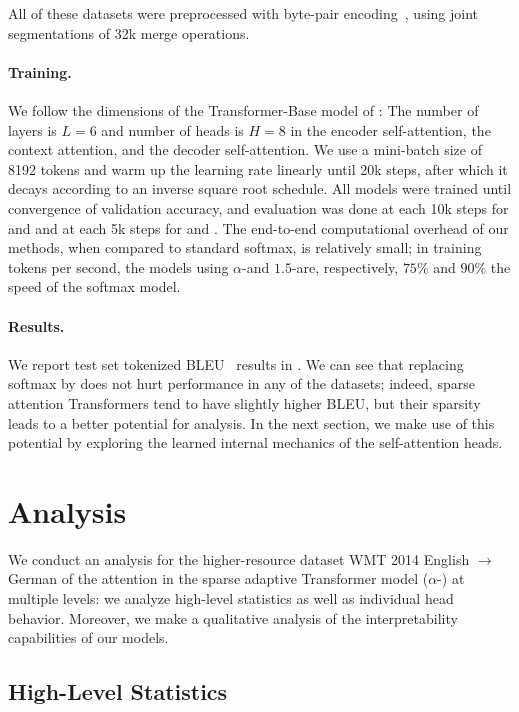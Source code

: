 All of these datasets were preprocessed with byte-pair
encoding~\citep[BPE;][]{sennrich2016neural}, using joint
segmentations of 32k merge operations.

\paragraph*{Training.}
We follow the dimensions of the Transformer-Base model of
\citet{vaswani2017attention}: The number of layers is $L=6$ and
number of heads is $H=8$ in the encoder self-attention, the context
attention, and the decoder self-attention. We use a mini-batch size
of 8192 tokens and warm up the learning rate linearly until 20k
steps, after which it decays according to an inverse square root
schedule. All models were trained until convergence of validation
accuracy, and evaluation was done at each 10k steps for
 and  and at each 5k steps for
 and . The end-to-end computational
overhead of our methods, when compared to standard softmax, is
relatively small; in training tokens per second, the models using
$\alpha$-\entmaxtext and $1.5$-\entmaxtext are, respectively, $75\%$
and $90\%$ the speed of the softmax model.

\paragraph*{Results.}
We report test set tokenized BLEU~\citep{papineni2002bleu} results in
. We can see that replacing softmax by
\entmaxtext{} does not hurt performance in any of the datasets;
indeed, sparse attention Transformers tend to have slightly higher
BLEU, but their sparsity leads to a better potential for analysis. In
the next section, we make use of this potential by exploring the
learned internal mechanics of the self-attention heads.

\section{Analysis}

We conduct an analysis for the higher-resource dataset WMT 2014
English $\rightarrow$ German of the attention in the sparse adaptive
Transformer model ($\alpha$-\entmaxtext) at multiple levels: we
analyze high-level statistics as well as individual head behavior.
Moreover, we make a qualitative analysis of the interpretability
capabilities of our models.

\subsection{High-Level Statistics}
\label{sec:stats}

